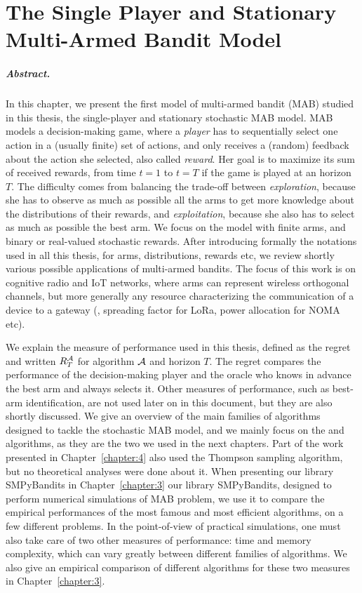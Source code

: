 
\chapter{The Single Player and Stationary Multi-Armed Bandit Model}
\label{chapter:2}
\minitoc


\paragraph{Abstract.}
%
In this chapter, we present the first model of multi-armed bandit (MAB) studied in this thesis,
the single-player and stationary stochastic MAB model.
MAB models a decision-making game, where a \emph{player} has to sequentially select one action in a (usually finite) set of actions, and only receives a (random) feedback about the action she selected, also called \emph{reward}.
Her goal is to maximize its sum of received rewards, from time $t=1$ to $t=T$ if the game is played at an horizon $T$. The difficulty comes from balancing the trade-off between \emph{exploration}, because she has to observe as much as possible all the arms to get more knowledge about the distributions of their rewards, and \emph{exploitation}, because she also has to select as much as possible the best arm.
%
We focus on the model with finite arms, and binary or real-valued stochastic rewards.
After introducing formally the notations used in all this thesis, for arms, distributions, rewards etc, we review shortly various possible applications of multi-armed bandits.
The focus of this work is on cognitive radio and IoT networks, where arms can represent wireless orthogonal channels, but more generally any resource characterizing the communication of a device to a gateway (\eg, spreading factor for LoRa, power allocation for NOMA etc).

We explain the measure of performance used in this thesis, defined as the regret and written $R_T^{\mathcal{A}}$ for algorithm $\mathcal{A}$ and horizon $T$. The regret compares the performance of the decision-making player and the oracle who knows in advance the best arm and always selects it.
Other measures of performance, such as best-arm identification, are not used later on in this document, but they are also shortly discussed.
%
We give an overview of the main families of algorithms designed to tackle the stochastic MAB model, and we mainly focus on the \UCB{} and \klUCB{} algorithms, as they are the two we used in the next chapters.
Part of the work presented in Chapter~\ref{chapter:4} also used the Thompson sampling algorithm, but no theoretical analyses were done about it.
When presenting our library SMPyBandits in Chapter~\ref{chapter:3} our library SMPyBandits, designed to perform numerical simulations of MAB problem, we use it to compare the empirical performances of the most famous and most efficient algorithms, on a few different problems.
%
In the point-of-view of practical simulations, one must also take care of two other measures of performance: time and memory complexity, which can vary greatly between different families of algorithms.
We also give an empirical comparison of different algorithms for these two measures in Chapter~\ref{chapter:3}.

